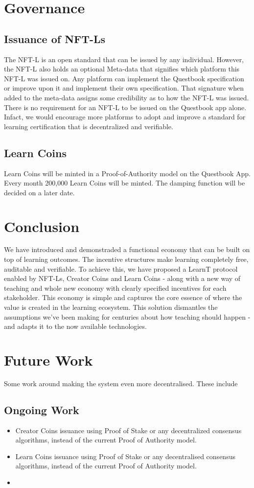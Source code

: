 \documentclass{article}
\begin{document}
  \section{Governance}
    \subsection{Issuance of NFT-Ls}
      The NFT-L is an open standard that can be issued by any individual. However, the NFT-L also holds an optional Meta-data that signifies which platform this NFT-L was issued on.
      Any platform can implement the Questbook specification or improve upon it and implement their own specification. That signature when added to the meta-data assigns some credibility as to how the NFT-L was issued.
      \break
      There is no requirement for an NFT-L to be issued on the Questbook app alone. Infact, we would encourage more platforms to adopt and improve a standard for learning certification that is decentralized and verifiable.
    \subsection{Learn Coins}
      Learn Coins will be minted in a Proof-of-Authority model on the Questbook App. Every month 200,000 Learn Coins will be minted. The damping function will be decided on a later date.
  \section{Conclusion}
    We have introduced and demonstraded a functional economy that can be built on top of learning outcomes. The incentive structures make learning completely free, auditable and verifiable. 
    To achieve this, we have proposed a LearnT protocol enabled by NFT-Ls, Creator Coins and Learn Coins - along with a new way of teaching and whole new economy with clearly specified incentives for each stakeholder.
    This economy is simple and captures the core essence of where the value is created in the learning ecosystem.
    This solution dismantles the assumptions we've been making for centuries about how teaching should happen - and adapts it to the now available technologies.
  \section{Future Work}
    Some work around making the system even more decentralised. These include
    \subsection{Ongoing Work}
      \begin{itemize}
        \item Creator Coins issuance using Proof of Stake or any decentralized consensus algorithms, instead of the current Proof of Authority model.
        \item Learn Coins issuance using Proof of Stake or any decentralised consensus algorithms, instead of the current Proof of Authority model.
        \item
      \end{itemize}
\end{document}
